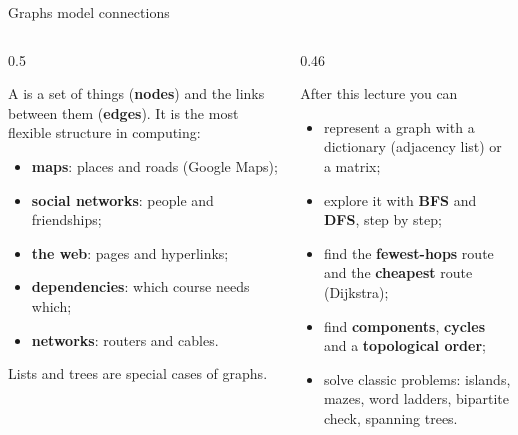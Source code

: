 \documentclass[aspectratio=169,10pt]{beamer}
\begin{document}
\begin{frame}[plain]\titlepage\end{frame}

\begin{frame}{Graphs model connections}
\begin{columns}[T]
\begin{column}{0.5\textwidth}
{\small
A  is a set of things (\textbf{nodes}) and the links between them (\textbf{edges}). It is the most flexible structure in computing:
\begin{itemize}\setlength\itemsep{3pt}
\item \textbf{maps}: places and roads (Google Maps);
\item \textbf{social networks}: people and friendships;
\item \textbf{the web}: pages and hyperlinks;
\item \textbf{dependencies}: which course needs which;
\item \textbf{networks}: routers and cables.
\end{itemize}
Lists and trees are special cases of graphs.}
\end{column}
\begin{column}{0.46\textwidth}
\begin{block}{After this lecture you can}
{\small
\begin{itemize}\setlength\itemsep{2pt}
\item represent a graph with a dictionary (adjacency list) or a matrix;
\item explore it with \textbf{BFS} and \textbf{DFS}, step by step;
\item find the \textbf{fewest-hops} route and the \textbf{cheapest} route (Dijkstra);
\item find \textbf{components}, \textbf{cycles} and a \textbf{topological order};
\item solve classic problems: islands, mazes, word ladders, bipartite check, spanning trees.
\end{itemize}}
\end{block}
\end{column}
\end{columns}
\end{frame}
\end{document}
